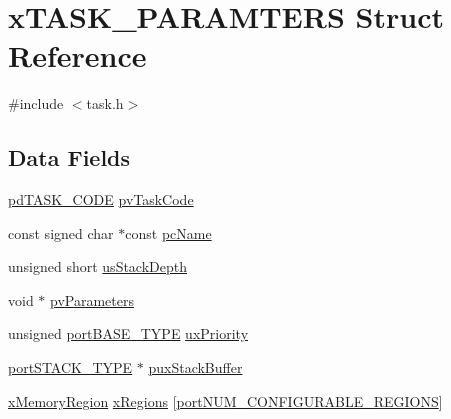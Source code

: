 \hypertarget{structx_t_a_s_k___p_a_r_a_m_t_e_r_s}{\section{x\-T\-A\-S\-K\-\_\-\-P\-A\-R\-A\-M\-T\-E\-R\-S Struct Reference}
\label{structx_t_a_s_k___p_a_r_a_m_t_e_r_s}
}


{\ttfamily \#include $<$task.\-h$>$}

\subsection*{Data Fields}
\begin{DoxyCompactItemize}
\item 
\hyperlink{projdefs_8h_ae74d12a2f9cb1fcae89532830b5413ac}{pd\-T\-A\-S\-K\-\_\-\-C\-O\-D\-E} \hyperlink{structx_t_a_s_k___p_a_r_a_m_t_e_r_s_af3147bdf057f9e7cf681674c143c19f0}{pv\-Task\-Code}
\item 
const signed char $\ast$const \hyperlink{structx_t_a_s_k___p_a_r_a_m_t_e_r_s_aa5448dc9631629653ed4da5d3ceb7f54}{pc\-Name}
\item 
unsigned short \hyperlink{structx_t_a_s_k___p_a_r_a_m_t_e_r_s_a79bae2c7efe48bf5b050e0b0d9eeed82}{us\-Stack\-Depth}
\item 
void $\ast$ \hyperlink{structx_t_a_s_k___p_a_r_a_m_t_e_r_s_a308cef200968d514395c0272c061d3ec}{pv\-Parameters}
\item 
unsigned \hyperlink{portmacro_8h_a1ebe82d24d764ae4e352f7c3a9f92c01}{port\-B\-A\-S\-E\-\_\-\-T\-Y\-P\-E} \hyperlink{structx_t_a_s_k___p_a_r_a_m_t_e_r_s_af9efa11aaf2bd2b1e7b0da3991a493c8}{ux\-Priority}
\item 
\hyperlink{portmacro_8h_ab0a294066ac7369b8f59a52d9491a92c}{port\-S\-T\-A\-C\-K\-\_\-\-T\-Y\-P\-E} $\ast$ \hyperlink{structx_t_a_s_k___p_a_r_a_m_t_e_r_s_a5db00ede8faab54ea3aa065251c8e37b}{pux\-Stack\-Buffer}
\item 
\hyperlink{task_8h_a0327ca449bbeb07a6f76456943c787dc}{x\-Memory\-Region} \hyperlink{structx_t_a_s_k___p_a_r_a_m_t_e_r_s_a3d1c92865cea10ff47b3bb47d21fc2fc}{x\-Regions} \mbox{[}\hyperlink{portable_8h_aca7e1a8a568a38b74cc9db10c8efebda}{port\-N\-U\-M\-\_\-\-C\-O\-N\-F\-I\-G\-U\-R\-A\-B\-L\-E\-\_\-\-R\-E\-G\-I\-O\-N\-S}\mbox{]}
\end{DoxyCompactItemize}


